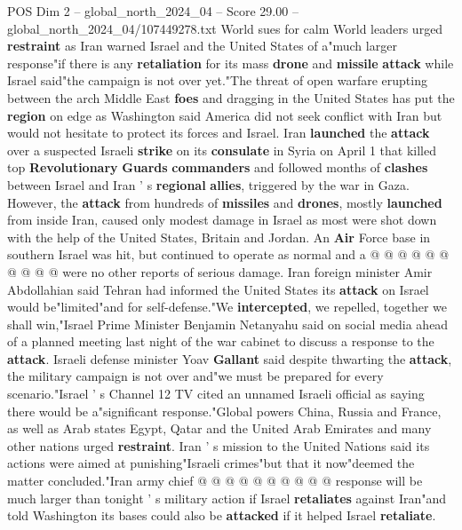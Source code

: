 \begin{textsample}{POS Dim 2 – global\_north\_2024\_04 – Score 29.00 – global\_north\_2024\_04/107449278.txt}  \label{ex:f2_pos_166}
World sues for calm World leaders urged \textbf{restraint} as Iran warned Israel and the United States of a"much larger response"if there is any \textbf{retaliation} for its mass \textbf{drone} and \textbf{missile} \textbf{attack} while Israel said"the campaign is not over yet."The threat of open warfare erupting between the arch Middle East \textbf{foes} and dragging in the United States has put the \textbf{region} on edge as Washington said America did not seek conflict with Iran but would not hesitate to protect its forces and Israel.
Iran \textbf{launched} the \textbf{attack} over a suspected Israeli \textbf{strike} on its \textbf{consulate} in Syria on April 1 that killed top \textbf{Revolutionary} \textbf{Guards} \textbf{commanders} and followed months of \textbf{clashes} between Israel and Iran ' s \textbf{regional} \textbf{allies}, triggered by the war in Gaza.
However, the \textbf{attack} from hundreds of \textbf{missiles} and \textbf{drones}, mostly \textbf{launched} from inside Iran, caused only modest damage in Israel as most were shot down with the help of the United States, Britain and Jordan.
An \textbf{Air} Force base in southern Israel was hit, but continued to operate as normal and a @ @ @ @ @ @ @ @ @ @ were no other reports of serious damage.
Iran foreign minister Amir Abdollahian said Tehran had informed the United States its \textbf{attack} on Israel would be"limited"and for self-defense."We \textbf{intercepted}, we repelled, together we shall win,"Israel Prime Minister Benjamin Netanyahu said on social media ahead of a planned meeting last night of the war cabinet to discuss a response to the \textbf{attack}.
Israeli defense minister Yoav \textbf{Gallant} said despite thwarting the \textbf{attack}, the military campaign is not over and"we must be prepared for every scenario."Israel ' s Channel 12 TV cited an unnamed Israeli official as saying there would be a"significant response."Global powers China, Russia and France, as well as Arab states Egypt, Qatar and the United Arab Emirates and many other nations urged \textbf{restraint}.
Iran ' s mission to the United Nations said its actions were aimed at punishing"Israeli crimes"but that it now"deemed the matter concluded."Iran army chief @ @ @ @ @ @ @ @ @ @ response will be much larger than tonight ' s military action if Israel \textbf{retaliates} against Iran"and told Washington its bases could also be \textbf{attacked} if it helped Israel \textbf{retaliate}.

\end{textsample}
